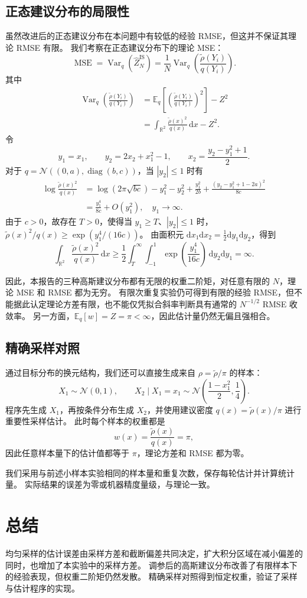 \documentclass[12pt,a4paper]{ctexart}
\newcommand{\R}{\mathbb{R}}
\newcommand{\E}{\mathbb{E}}
\DeclareMathOperator{\Var}{Var}
\newcommand{\rhoT}{\widetilde{\rho}}
\begin{document}
\subsection{正态建议分布的局限性}
虽然改进后的正态建议分布在本问题中有较低的经验 RMSE，但这并不保证其理论 RMSE 有限。
我们考察在正态建议分布下的理论 MSE：
\[
\operatorname{MSE} = \Var_q(\widehat Z_N^{\mathrm{IS}}) = \frac{1}{N}\Var_q\left(\frac{\rhoT(Y_i)}{q(Y_i)}\right).
\]
其中
\[
\begin{aligned}
\Var_q\left(\frac{\rhoT(Y_i)}{q(Y_i)}\right)
&=\E_q\left[\left(\frac{\rhoT(Y_i)}{q(Y_i)}\right)^2\right]-Z^2 \\
&=\int_{\R^2}\frac{\rhoT(x)^2}{q(x)}\,\mathrm{d}x-Z^2.
\end{aligned}
\]
令
\[
y_1=x_1,\qquad y_2=2x_2+x_1^2-1,\qquad
x_2=\frac{y_2-y_1^2+1}{2}.
\]
对于 $q=\mathcal N((0,a),\operatorname{diag}(b,c))$，当 $|y_2|\le1$ 时有
\[
\begin{aligned}
\log\frac{\rhoT(x)^2}{q(x)}
&=\log(2\pi\sqrt{bc})-y_1^2-y_2^2+\frac{y_1^2}{2b}
  +\frac{(y_2-y_1^2+1-2a)^2}{8c} \\
&=\frac{y_1^4}{8c}+O(y_1^2), \quad y_1\to\infty.
\end{aligned}
\]
由于 $c>0$，故存在 $T>0$，使得当 $y_1\ge T$、$|y_2|\le1$ 时，$\rhoT(x)^2/q(x)\ge\exp(y_1^4/(16c))$。
由面积元 $\mathrm{d}x_1\mathrm{d}x_2=\frac12\mathrm{d}y_1\mathrm{d}y_2$，得到
\[
\int_{\R^2}\frac{\rhoT(x)^2}{q(x)}\,\mathrm{d}x
\ge\frac12\int_T^\infty\int_{-1}^1
\exp\left(\frac{y_1^4}{16c}\right)\,\mathrm{d}y_2\mathrm{d}y_1=\infty.
\]

因此，本报告的三种高斯建议分布都有无限的权重二阶矩，对任意有限的 $N$，理论 MSE 和 RMSE 都为无穷。
有限次重复实验仍可得到有限的经验 RMSE，但不能据此认定理论方差有限，也不能仅凭拟合斜率判断具有通常的 $N^{-1/2}$ RMSE 收敛率。
另一方面，$\E_q[w]=Z=\pi<\infty$，因此估计量仍然无偏且强相合。

\subsection{精确采样对照}

通过目标分布的换元结构，我们还可以直接生成来自 $\rho=\rhoT/\pi$ 的样本：
\[
X_1\sim\mathcal N(0,1),\qquad
X_2\mid X_1=x_1\sim\mathcal N\left(\frac{1-x_1^2}{2},\frac14\right).
\]
程序先生成 $X_1$，再按条件分布生成 $X_2$，并使用建议密度 $q(x)=\rhoT(x)/\pi$ 进行重要性采样估计。
此时每个样本的权重都是
\[
w(x)=\frac{\rhoT(x)}{q(x)}=\pi,
\]
因此任意样本量下的估计值都等于 $\pi$，理论方差和 RMSE 都为零。

我们采用与前述小样本实验相同的样本量和重复次数，保存每轮估计并计算统计量。
实际结果的误差为零或机器精度量级，与理论一致。

\section{总结}

均匀采样的估计误差由采样方差和截断偏差共同决定，扩大积分区域在减小偏差的同时，也增加了本实验中的采样方差。
调参后的高斯建议分布改善了有限样本下的经验表现，但权重二阶矩仍然发散。
精确采样对照得到恒定权重，验证了采样与估计程序的实现。
\end{document}
